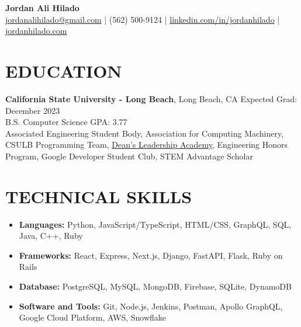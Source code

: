 \documentclass[a4paper,10pt]{extarticle}
\begin{document}
\pagestyle{empty}

\begin{center}
\textbf{\Large Jordan Ali Hilado}\\[2pt] %
\href{mailto:jordanalihilado@gmail.com}{jordanalihilado@gmail.com} | (562) 500-9124 | \href{https://www.linkedin.com/in/jordanhilado}{linkedin.com/in/jordanhilado} | \href{https://jordanhilado.com/}{jordanhilado.com} %
\end{center}

\section*{EDUCATION}
\noindent
\textbf{California State University - Long Beach}, Long Beach, CA \hfill Expected Grad: December 2023\\ %
B.S. Computer Science \hfill GPA: 3.77\\ %
Associated Engineering Student Body, Association for Computing Machinery, CSULB Programming Team, \href{https://www.csulb.edu/college-of-engineering/aerospace-corporation-leadership-academy}{Dean’s Leadership Academy}, Engineering Honors Program, Google Developer Student Club, STEM Advantage Scholar %

\section*{TECHNICAL SKILLS}
\begin{itemize}
    \item \textbf{Languages:} Python, JavaScript/TypeScript, HTML/CSS, GraphQL, SQL, Java, C++, Ruby %
    \item \textbf{Frameworks:} React, Express, Next.js, Django, FastAPI, Flask, Ruby on Rails %
    \item \textbf{Database:} PostgreSQL, MySQL, MongoDB, Firebase, SQLite, DynamoDB %
    \item \textbf{Software and Tools:} Git, Node.js, Jenkins, Postman, Apollo GraphQL, Google Cloud Platform, AWS, Snowflake %
\end{itemize}

\end{document}
